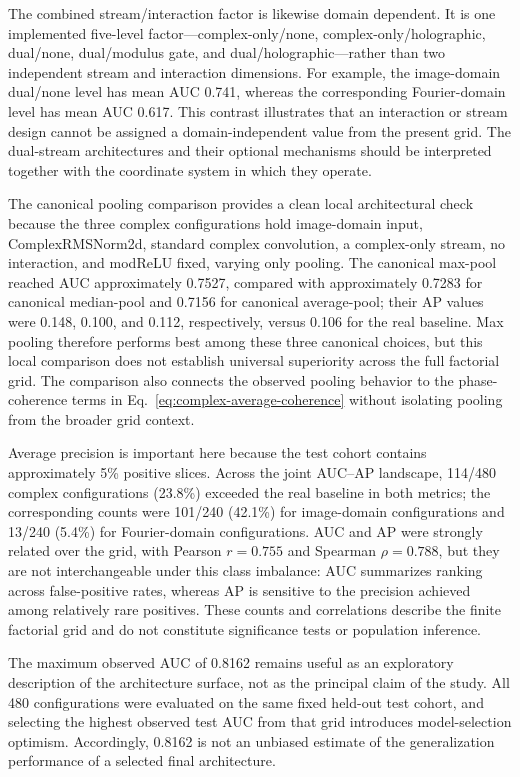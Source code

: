 The combined stream/interaction factor is likewise domain dependent. It is one implemented five-level factor---complex-only/none, complex-only/holographic, dual/none, dual/modulus gate, and dual/holographic---rather than two independent stream and interaction dimensions. For example, the image-domain dual/none level has mean AUC 0.741, whereas the corresponding Fourier-domain level has mean AUC 0.617. This contrast illustrates that an interaction or stream design cannot be assigned a domain-independent value from the present grid. The dual-stream architectures and their optional mechanisms should be interpreted together with the coordinate system in which they operate.

The canonical pooling comparison provides a clean local architectural check because the three complex configurations hold image-domain input, ComplexRMSNorm2d, standard complex convolution, a complex-only stream, no interaction, and modReLU fixed, varying only pooling. The canonical max-pool reached AUC approximately 0.7527, compared with approximately 0.7283 for canonical median-pool and 0.7156 for canonical average-pool; their AP values were 0.148, 0.100, and 0.112, respectively, versus 0.106 for the real baseline. Max pooling therefore performs best among these three canonical choices, but this local comparison does not establish universal superiority across the full factorial grid. The comparison also connects the observed pooling behavior to the phase-coherence terms in Eq.~\eqref{eq:complex-average-coherence} without isolating pooling from the broader grid context.

Average precision is important here because the test cohort contains approximately 5\% positive slices. Across the joint AUC--AP landscape, 114/480 complex configurations (23.8\%) exceeded the real baseline in both metrics; the corresponding counts were 101/240 (42.1\%) for image-domain configurations and 13/240 (5.4\%) for Fourier-domain configurations. AUC and AP were strongly related over the grid, with Pearson $r=0.755$ and Spearman $\rho=0.788$, but they are not interchangeable under this class imbalance: AUC summarizes ranking across false-positive rates, whereas AP is sensitive to the precision achieved among relatively rare positives. These counts and correlations describe the finite factorial grid and do not constitute significance tests or population inference.

The maximum observed AUC of 0.8162 remains useful as an exploratory description of the architecture surface, not as the principal claim of the study. All 480 configurations were evaluated on the same fixed held-out test cohort, and selecting the highest observed test AUC from that grid introduces model-selection optimism. Accordingly, 0.8162 is not an unbiased estimate of the generalization performance of a selected final architecture.


